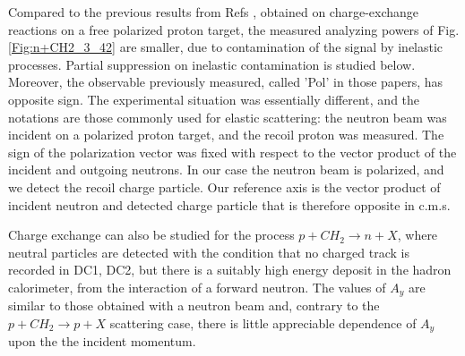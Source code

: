 \documentclass[epj]{svjour}
\begin{document}
Compared to the previous results from Refs \cite{PhysRevLett.30.1183,Robrish:1970jw}, obtained on charge-exchange reactions on a free polarized proton target, the measured analyzing powers of Fig. \ref{Fig:n+CH2_3_42} are smaller, due to contamination of the signal by inelastic processes.  Partial suppression on inelastic contamination is studied below. Moreover, the observable previously measured, called 'Pol' in those papers, has opposite sign. The experimental situation was essentially different, and the notations are those commonly used for elastic scattering: the neutron beam was incident on a polarized proton target, and the recoil proton was measured. The sign of the polarization vector was fixed with respect to the vector product of the incident and outgoing neutrons.  In our case the neutron beam is polarized,  and we detect 
the recoil charge particle. Our reference axis is the vector product of incident neutron and detected charge particle  that is therefore opposite in c.m.s. 

Charge exchange can also be studied for the process $p+CH_2\to n+X$, where neutral particles are detected with the condition that no charged track is recorded in DC1, DC2, but there is a suitably high energy deposit in the hadron calorimeter, from the interaction of a forward neutron.
The values of $A_y$ are similar to those obtained with a neutron beam and, contrary to the $p+CH_2\to p+X$ scattering case, there is little appreciable dependence of $A_y$ upon the the incident momentum. 

\end{document}

